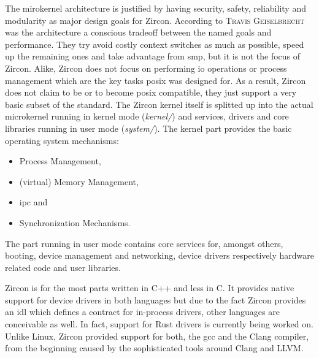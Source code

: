 The mirokernel architecture is justified by having security, safety, reliability and modularity as major design goals for Zircon.
According to \textsc{Travis Geiselbrecht} was the architecture a conscious tradeoff between the named goals and performance\cite{chat-zircon-arch}.
They try avoid costly context switches as much as possible, speed up the remaining ones and take advantage from \ac{smp}, but it is not the focus of Zircon.
Alike, Zircon does not focus on performing \ac{io} operations or process management which are the key tasks \ac{posix} was designed for\cite{chat-zircon-arch}.
As a result, Zircon does not claim to be or to become \ac{posix} compatible, they just support a very basic subset of the standard\cite{zircon-libc-posix}.
The Zircon kernel itself is splitted up into the actual microkernel running in kernel mode (\textit{kernel/}) and services, drivers and core libraries running in user mode (\textit{system/})\cite{zircon-intro}.
The kernel part provides the basic operating system mechanisms: 
\begin{itemize}
    \item Process Management,
    \item (virtual) Memory Management,
    \item \acl{ipc} and
    \item Synchronization Mechanisms\cite{zircon-intro}.
\end{itemize}
The part running in user mode contains core services for, amongst others, booting, device management and networking, device drivers respectively hardware related code and user libraries.

Zircon is for the most parts written in C++ and less in C.
It provides native support for device drivers in both languages but due to the fact Zircon provides an \ac{idl} which defines a contract for in-process drivers, other languages are conceivable as well.
In fact, support for Rust drivers is currently being worked on\cite{chat-zircon-arch}.
Unlike Linux, Zircon provided support for both, the \ac{gcc} and the Clang compiler, from the beginning caused by the sophisticated tools around Clang and LLVM\@.


